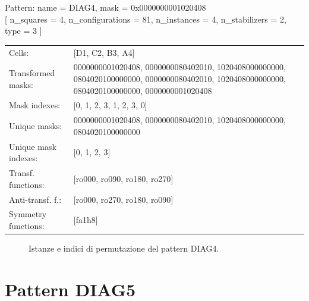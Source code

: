 \begin{tcolorbox}[sharp corners, fontupper=\ttfamily\small, colback=white]
  \noindent Pattern: name = DIAG4, mask = 0x0000000001020408\\
  {[} n\_squares = 4, n\_configurations = 81,
  n\_instances = 4, n\_stabilizers = 2, type = 3 { ]}\\[1.0ex]
  \begin{tabularx}{\textwidth}{@{} p{3.5cm} X @{}}
    Cells:               & {[}D1, C2, B3, A4{]}\\[0.5ex]
    Transformed masks:   & 0000000001020408, 0000000080402010, 1020408000000000, 0804020100000000, 0000000080402010, 1020408000000000, 0804020100000000, 0000000001020408\\[0.5ex]
    Mask indexes:        & {[}0, 1, 2, 3, 1, 2, 3, 0{]}\\[0.5ex]
    Unique masks:        & 0000000001020408, 0000000080402010, 1020408000000000, 0804020100000000\\[0.5ex]
    Unique mask indexes: & {[}0, 1, 2, 3{]}\\[0.5ex]
    Transf. functions:   & {[}ro000, ro090, ro180, ro270{]}\\[0.5ex]
    Anti-transf. f.:     & {[}ro000, ro270, ro180, ro090{]}\\[0.5ex]
    Symmetry functions:  & {[}fa1h8{]}\\[0.5ex]
  \end{tabularx}
\end{tcolorbox}

\begin{figure}[htbp]
  \centering
   \hfill
   \hfill
   \hfill
  \vspace{0.3cm}
   \hfill
   \hfill
   \hfill
  \caption{Istanze e indici di permutazione del pattern DIAG4.}
\end{figure}

\newpage

\section{Pattern DIAG5}

